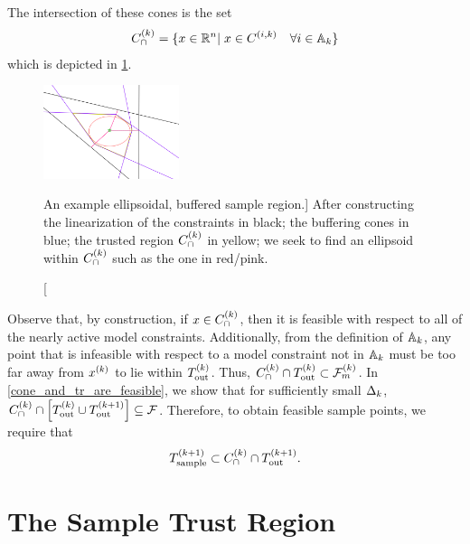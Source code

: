 The intersection of these cones is the set
\begin{align}
{C^{(k)}_{\cap}} = \{x\in\mathbb R^n | \; x \in {C^{(i, k)}} \quad \forall i \in {\mathbb A_{k}} \} \label{define_capcones}
\end{align}
which is depicted in \cref{completed_2}.

\begin{figure}[ht]
    \centering
    \includegraphics[width=150px]{images/completed_2.png}
    \caption
    	[An example ellipsoidal, buffered sample region.]{
    	After constructing 
    	the linearization of the constraints in black;
    	the buffering cones in blue;
    	the trusted region ${C^{(k)}_{\cap}}$ in yellow;
    	we seek to find an ellipsoid within ${C^{(k)}_{\cap}}$ such as the one in red/pink.
	}
    \label{completed_2}
\end{figure}

Observe that, by construction,  if $x \in {C^{(k)}_{\cap}}$, then it is feasible with respect to all of the nearly active model constraints.
Additionally,  from the definition of ${\mathbb A_{k}}$, any point that is infeasible with respect to a model constraint not in ${\mathbb A_{k}}$
must be too far away from $x^{(k)}$ to lie within  ${T_{\text{out}}^{(k)}}$.
Thus,  ${C^{(k)}_{\cap}} \cap {T_{\text{out}}^{(k)}} \subset {\mathcal F_m^{(k)}}$.
In \cref{cone_and_tr_are_feasible}, we show that for sufficiently small $\Delta_k$, ${C^{(k)}_{\cap}} \cap \left[{T_{\text{out}}^{(k)}} \cup {T_{\text{out}}^{(k+1)}}\right] \subseteq {\mathcal F}$.
Therefore, to obtain feasible sample points, we require that 
\begin{align*}
{T_{\text{sample}}^{(k+1)}} \subset {C^{(k)}_{\cap}} \cap {T_{\text{out}}^{(k+1)}}.
\end{align*}






\section{The Sample Trust Region}
\label{possible_ellipsoids}

